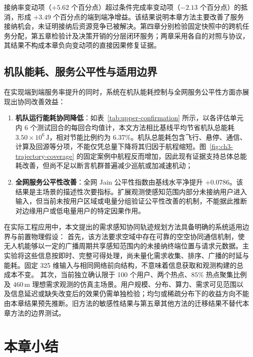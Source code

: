 接纳率变动项（$+5.62$ 个百分点）超过条件完成率变动项（$-2.13$ 个百分点）的抵消，形成 $+3.49$ 个百分点的端到端净增益。该结果说明本章方法主要改善了服务接纳机会，未证明接纳后资源竞争已被解决。第四章分别检验固定快照中的跨机任务分配，第五章检验计及决策开销的分层闭环服务；两章采用各自的对照与协议，其结果不构成本章负向变动项的直接因果修复证据。

\subsection{机队能耗、服务公平性与适用边界}
\label{sec:ch3-non-claims}

在实现端到端服务率提升的同时，系统在机队能耗控制与全网服务公平性方面亦展现出协同改善效益：
\begin{enumerate}
    \item \textbf{机队运行能耗协同降低}：如表~\ref{tab:upper-confirmation} 所示，以各评估单元内 6 个测试回合的每回合均值计，本文方法相比基线平均节省机队总能耗 $3.50\times 10^6\,\mathrm{J}$，相对节能比例约为 $6.37\%$。机队总能耗包含飞行、悬停、通信、计算及回源等分项，不能仅凭总量下降将其归因于航程缩短。图~\ref{fig:ch3-trajectory-coverage} 的固定案例中航程反而增加，因此现有证据支持总体总能耗改善，但尚不足以断言机群普遍减少巡航或加减速机动；
    \item \textbf{全网服务公平性改善}：全网 Jain 公平性指数由基线水平净提升 $+0.0786$。该结果是主场景的描述性次要指标。扩展观测使感知范围内部分未接纳用户进入输入，但当前未按用户区域或电量分组验证公平性改善的机制，不能据此推断对边缘用户或低电量用户的特定因果作用。
\end{enumerate}

在实际工程应用中，本文提出的需求感知协同轨迹规划方法具备明确的系统适用边界与前置物理假设：
首先，该方法要求空域中存在可靠的空空协同通信机制，使无人机能够以一定的广播周期共享感知范围内的未接纳终端位置与请求元数据。主实验将这些信息按即时、完整可得处理，尚未量化需求收集、排序、广播的时延与能耗。固定 325 维输入与相同网络前向结构，不意味着信息获取和观测构建的总成本不变。
其次，当前独立确认限于 100 个用户、两个热点、$85\%$ 热点聚集比例及 $460\,\mathrm{m}$ 理想需求观测的仿真主场景。用户规模、分布、算力、需求可见范围以及信息延迟或缺失改变后的效果仍需单独检验；均匀或稀疏分布下的收益方向不能由本章结果预先推断。旧方法的敏感性结果与第五章其他方法的迁移结果不替代本章方法的边界测试。

\section{本章小结}
\label{sec:ch3-summary}

